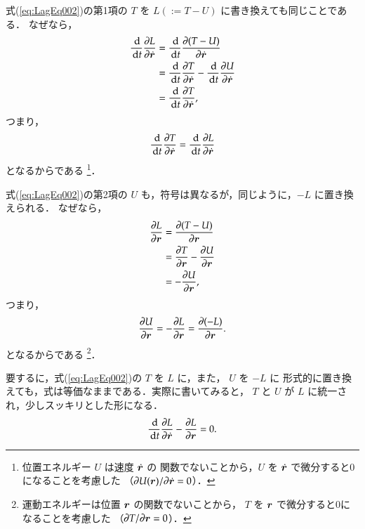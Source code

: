             式(\ref{eq:LagEq002})の第1項の $T$ を $L(:=T-U)$ に書き換えても同じことである．
            なぜなら，
                \begin{align*}
                       \frac{\,\mathrm{d}}{\,\mathrm{d} t}\frac{\partial L}{\partial \dot{\boldsymbol{r}}}
                   &=   \frac{\,\mathrm{d}}{\,\mathrm{d} t}\frac{\partial (T-U)}{\partial \dot{\boldsymbol{r}}} \\
                   &=   \frac{\,\mathrm{d}}{\,\mathrm{d} t}\frac{\partial T}{\partial \dot{\boldsymbol{r}}}
                     - \frac{\,\mathrm{d}}{\,\mathrm{d} t}\frac{\partial U}{\partial \dot{\boldsymbol{r}}} \\
                   &=   \frac{\,\mathrm{d}}{\,\mathrm{d} t}\frac{\partial T}{\partial \dot{\boldsymbol{r}}},
                \end{align*}
            つまり，
                \begin{equation*}
                       \frac{\,\mathrm{d}}{\,\mathrm{d} t}\frac{\partial T}{\partial \dot{\boldsymbol{r}}}
                    =  \frac{\,\mathrm{d}}{\,\mathrm{d} t}\frac{\partial L}{\partial \dot{\boldsymbol{r}}}
                \end{equation*}
            となるからである
                \footnote{
                    位置エネルギー $U$ は速度 $\dot{\boldsymbol{r}}$ の
                    関数でないことから，$U$ を $\dot{\boldsymbol{r}}$ で微分すると0になることを考慮した
                    （$\partial U(\boldsymbol{r})/\partial \dot{\boldsymbol{r}} = 0$）．
                }．

            式(\ref{eq:LagEq002})の第2項の $U$ も，符号は異なるが，同じように，$-L$ に置き換えられる．
            なぜなら，
                \begin{align*}
                       \frac{\partial L}{\partial \boldsymbol{r}}
                    &=  \frac{\partial (T-U)}{\partial \boldsymbol{r}} \\
                    &=  \frac{\partial T}{\partial \boldsymbol{r}} - \frac{\partial U}{\partial \boldsymbol{r}} \\
                    &=  - \frac{\partial U}{\partial \boldsymbol{r}},
                \end{align*}
            つまり，
                \begin{equation*}
                    \frac{\partial U}{\partial \boldsymbol{r}} = -\frac{\partial L}{\partial \boldsymbol{r}} = \frac{\partial (-L)}{\partial \boldsymbol{r}}.
                \end{equation*}
            となるからである
                \footnote{
                    運動エネルギーは位置 $\boldsymbol{r}$ の関数でないことから，
                    $T$ を $\boldsymbol{r}$ で微分すると0になることを考慮した
                    （$\partial T/ \partial \boldsymbol{r} = 0$）．
                }．

            要するに，式(\ref{eq:LagEq002})の $T$ を $L$ に，また， $U$ を $-L$ に
            形式的に置き換えても，式は等価なままである．実際に書いてみると，
            $T$ と $U$ が $L$ に統一され，少しスッキリとした形になる．
                \begin{align}
                   \frac{\,\mathrm{d}}{\,\mathrm{d} t}\frac{\partial L}{\partial \dot{\boldsymbol{r}}} - \frac{\partial L}{\partial \boldsymbol{r}} = 0.
                \end{align}

